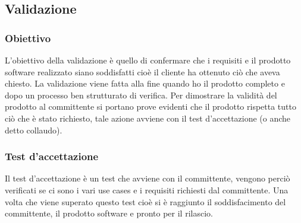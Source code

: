 
\subsection{Validazione}
\subsubsection{Obiettivo}
L’obiettivo della validazione è quello di confermare che i requisiti e il prodotto software realizzato siano soddisfatti cioè il cliente ha ottenuto ciò che aveva chiesto. La validazione viene fatta alla fine quando ho il prodotto completo e dopo un processo ben strutturato di verifica. Per dimostrare la validità del prodotto al committente si portano prove evidenti che il prodotto rispetta tutto ciò che è stato richiesto, tale azione avviene con il test d’accettazione (o anche detto collaudo).

\subsubsection{Test d’accettazione} 
Il test d’accettazione è un test che avviene con il committente, vengono perciò verificati se ci sono i vari use cases e i requisiti richiesti dal committente. Una volta che viene superato questo test cioè si è raggiunto il soddisfacimento del committente, il prodotto software e pronto per il rilascio.